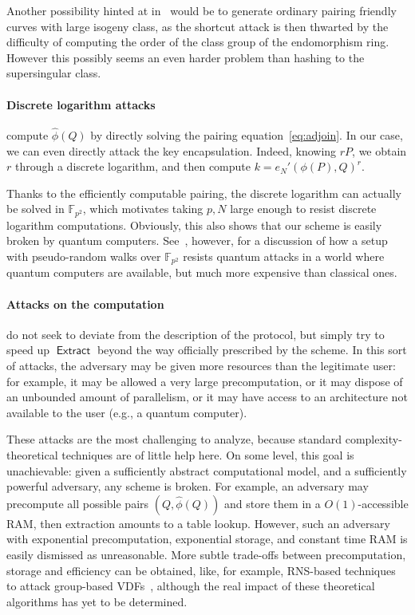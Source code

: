 \documentclass{llncs}
\newcommand{\F}{\mathbb{F}}
\DeclareMathOperator{\Extract}{\mathsf{Extract}}
\begin{document}
Another possibility hinted at in~\cite{10.1007/978-3-030-34578-5_10}
would be to generate ordinary pairing friendly curves with large
isogeny class, as the shortcut attack is then thwarted by the
difficulty of computing the order of the class group of the
endomorphism ring. %
However this possibly seems an even harder problem than hashing to the
supersingular class.

\paragraph{Discrete logarithm attacks} compute $\hat\phi(Q)$ by
directly solving the pairing equation~\eqref{eq:adjoin}. %
In our case, we can even directly attack the key encapsulation. %
Indeed, knowing $rP$, we obtain $r$ through a discrete logarithm, and
then compute $k=e_N'(\phi(P),Q)^r$.

Thanks to the efficiently computable pairing, the discrete logarithm
can actually be solved in $\F_{p^2}$, which motivates taking $p,N$
large enough to resist discrete logarithm computations. %
Obviously, this also shows that our scheme is easily broken by quantum
computers. %
See~\cite{10.1007/978-3-030-34578-5_10}, however, for a discussion of
how a setup with pseudo-random walks over $\F_{p^2}$ resists quantum
attacks in a world where quantum computers are available, but much
more expensive than classical ones.

\paragraph{Attacks on the computation} do not seek to deviate from the
description of the protocol, but simply try to speed up $\Extract$
beyond the way officially prescribed by the scheme. %
In this sort of attacks, the adversary may be given more resources
than the legitimate user: for example, it may be allowed a very large
precomputation, or it may dispose of an unbounded amount of
parallelism, or it may have access to an architecture not available to
the user (e.g., a quantum computer).

These attacks are the most challenging to analyze, because standard
complexity-theoretical techniques are of little help here. %
On some level, this goal is unachievable: given a sufficiently
abstract computational model, and a sufficiently powerful adversary,
any scheme is broken. %
For example, an adversary may precompute all possible pairs
$(Q,\hat\phi(Q))$ and store them in a $O(1)$-accessible RAM, then
extraction amounts to a table lookup. %
However, such an adversary with exponential precomputation,
exponential storage, and constant time RAM is easily dismissed as
unreasonable. %
More subtle trade-offs between precomputation, storage and efficiency
can be obtained, like, for example, RNS-based techniques to attack
group-based VDFs~\cite{BernsteinSorenson07}, although the real impact
of these theoretical algorithms has yet to be determined.
\end{document}
